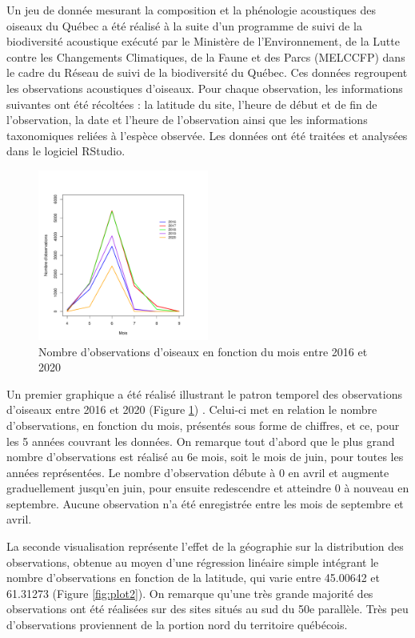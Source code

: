 \documentclass[9pt,twocolumn,twoside,]{pnas-new}
\begin{document}
Un jeu de donnée mesurant la composition et la phénologie acoustiques
des oiseaux du Québec a été réalisé à la suite d'un programme de suivi
de la biodiversité acoustique exécuté par le Ministère de
l'Environnement, de la Lutte contre les Changements Climatiques, de la
Faune et des Parcs (MELCCFP) dans le cadre du Réseau de suivi de la
biodiversité du Québec. Ces données regroupent les observations
acoustiques d'oiseaux. Pour chaque observation, les informations
suivantes ont été récoltées : la latitude du site, l'heure de début et
de fin de l'observation, la date et l'heure de l'observation ainsi que
les informations taxonomiques reliées à l'espèce observée. Les données
ont été traitées et analysées dans le logiciel RStudio.

\begin{figure}
\centering
\includegraphics[width=0.5\textwidth,height=0.4\textheight]{../figures/observation_mois_annee.pdf}
\caption{Nombre d'observations d'oiseaux en fonction du mois entre 2016
et 2020\label{fig:plot1}}
\end{figure}

Un premier graphique a été réalisé illustrant le patron temporel des
observations d'oiseaux entre 2016 et 2020 (Figure \ref{fig:plot1}) .
Celui-ci met en relation le nombre d'observations, en fonction du mois,
présentés sous forme de chiffres, et ce, pour les 5 années couvrant les
données. On remarque tout d'abord que le plus grand nombre
d'observations est réalisé au 6e mois, soit le mois de juin, pour toutes
les années représentées. Le nombre d'observation débute à 0 en avril et
augmente graduellement jusqu'en juin, pour ensuite redescendre et
atteindre 0 à nouveau en septembre. Aucune observation n'a été
enregistrée entre les mois de septembre et avril.

La seconde visualisation représente l'effet de la géographie sur la
distribution des observations, obtenue au moyen d'une régression
linéaire simple intégrant le nombre d'observations en fonction de la
latitude, qui varie entre 45.00642 et 61.31273 (Figure \ref{fig:plot2}).
On remarque qu'une très grande majorité des observations ont été
réalisées sur des sites situés au sud du 50e parallèle. Très peu
d'observations proviennent de la portion nord du territoire québécois.
\end{document}
